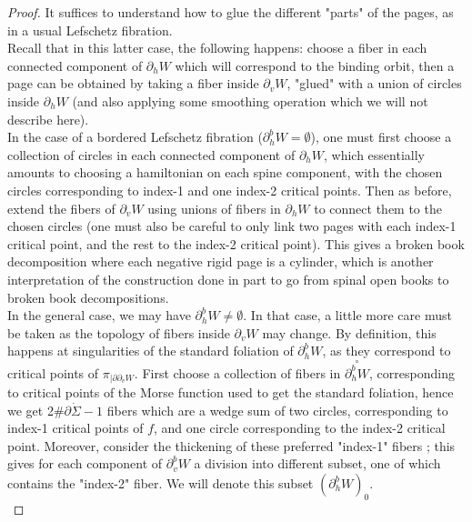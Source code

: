\documentclass[../main.tex]{subfiles}
\begin{document}
\begin{proof}
It suffices to understand how to glue the different "parts" of the pages, as in a usual Lefschetz fibration.\\
Recall that in this latter case, the following happens: choose a fiber in each connected component of $\partial_h W$ which will correspond to the binding orbit, then a page can be obtained by taking a fiber inside $\partial_vW$, "glued" with a union of circles inside $\partial_h W$ (and also applying some smoothing operation which we will not describe here).\\
In the case of a bordered Lefschetz fibration ($\partial_h^bW = \emptyset$), one must first choose a collection of circles in each connected component of $\partial_hW$, which essentially amounts to choosing a hamiltonian on each spine component, with the chosen circles corresponding to index-1 and one index-2 critical points. Then as before, extend the fibers of $\partial_v W$ using unions of fibers in $\partial_h W$ to connect them to the chosen circles (one must also be careful to only link two pages with each index-1 critical point, and the rest to the index-2 critical point). This gives a broken book decomposition where each negative rigid page is a cylinder, which is another interpretation of the construction done in part \cite{p:IV} to go from spinal open books to broken book decompositions.\\
In the general case, we may have $\partial_h^bW \neq \emptyset$. In that case, a little more care must be taken as the topology of fibers inside $\partial_v W$ may change. By definition, this happens at singularities of the standard foliation of $\partial_h^bW$, as they correspond to critical points of $\pi_{|\partial\partial_vW}$. First choose a collection of fibers in $\overset{\circ}{\partial_h^bW}$, corresponding to critical points of the Morse function used to get the standard foliation, hence we get 2$\#\partial\dot \Sigma-1$ fibers which are a wedge sum of two circles, corresponding to index-1 critical points of $f$, and one circle corresponding to the index-2 critical point. Moreover, consider the thickening of these preferred "index-1" fibers ; this gives for each component of $\partial_v^bW$ a division into different subset, one of which contains the "index-2" fiber. We will denote this subset $(\partial_h^bW)_0$. \\

\end{proof}
\end{document}
